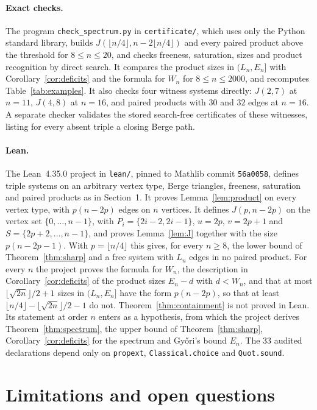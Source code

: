 \documentclass[11pt]{article}
\theoremstyle{remark}
\begin{document}
\paragraph{Exact checks.} The program \texttt{check\_spectrum.py} in
\texttt{certificate/}, which uses only the Python standard library, builds
$J(\lfloor n/4\rfloor, n-2\lfloor n/4\rfloor)$ and every paired product above the threshold for
$8\le n\le 20$, and checks freeness, saturation, sizes and product
recognition by direct search. It compares the product sizes in
$(L_n,E_n]$ with Corollary~\ref{cor:deficits} and the formula for $W_n$
for $8\le n\le 2000$, and recomputes Table~\ref{tab:examples}. It also
checks four witness systems directly: $J(2,7)$ at $n=11$, $J(4,8)$ at
$n=16$, and paired products with $30$ and $32$ edges at $n=16$. A separate checker validates the stored
search-free certificates of these witnesses, listing for every absent
triple a closing Berge path.

\paragraph{Lean.} The Lean~4.35.0 project in \texttt{lean/}, pinned to
Mathlib commit \texttt{56a0058}, defines triple systems on an arbitrary
vertex type, Berge triangles, freeness, saturation and paired products as
in Section~1. It proves Lemma~\ref{lem:product} on every vertex type, with
$p(n-2p)$ edges on $n$ vertices. It defines $J(p,n-2p)$ on the vertex set
$\{0,\dots,n-1\}$, with $P_i=\{2i-2,2i-1\}$, $u=2p$, $v=2p+1$ and
$S=\{2p+2,\dots,n-1\}$, and proves Lemma~\ref{lem:J} together with the size
$p(n-2p-1)$. With $p=\lfloor n/4\rfloor$ this gives, for every $n\ge8$, the
lower bound of Theorem~\ref{thm:sharp} and a free system with $L_n$ edges
in no paired product. For every $n$ the project proves the formula for
$W_n$, the description in Corollary~\ref{cor:deficits} of the product sizes
$E_n-d$ with $d<W_n$, and that at most $\lfloor\sqrt{2n}\rfloor/2+1$
sizes in $(L_n,E_n]$ have the form $p(n-2p)$, so that at least
$\lfloor n/4\rfloor-\lfloor\sqrt{2n}\rfloor/2-1$ do not.
Theorem~\ref{thm:containment} is not proved in Lean. Its statement at
order $n$ enters as a hypothesis, from which the project derives
Theorem~\ref{thm:spectrum}, the upper bound of Theorem~\ref{thm:sharp},
Corollary~\ref{cor:deficits} for the spectrum and Gy\H{o}ri's bound $E_n$.
The 33 audited declarations depend only on \texttt{propext},
\texttt{Classical.choice} and \texttt{Quot.sound}.

\section{Limitations and open questions}\label{sec:limits}
\end{document}
